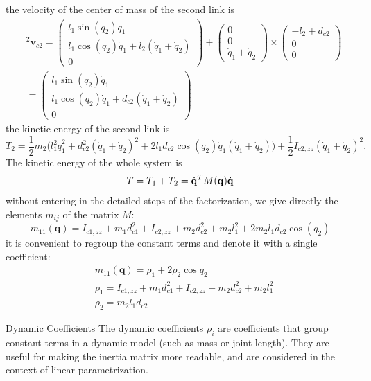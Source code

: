 \documentclass[10pt, a4paper]{report}
\newcommand{\q}{{\mathbf q}}
\begin{document}
the velocity of the center of mass of the second link is\begin{align}
    &{}^2\mathbf v_{c2}=\begin{pmatrix}
        l_1\sin (q_2)\dot q_1\\l_1\cos(q_2)\dot q_1 + l_2(\dot q_1+\dot q_2)
        \\0
    \end{pmatrix}+\begin{pmatrix}
        0\\0\\\dot q_1+\dot q_2
    \end{pmatrix}\times \begin{pmatrix}
        -l_2+d_{c2}\\ 0\\ 0
    \end{pmatrix}\\[1.5ex]
    &=\begin{pmatrix}
        l_1\sin(q_2)\dot q_1\\ 
        l_1\cos(q_2)\dot q_1+d_{c2}(\dot q_1+\dot q_2)
        \\ 0
    \end{pmatrix}
\end{align}
the kinetic energy of the second link is\begin{equation}
    T_2=\frac{1}{2}m_2\big ( l_1^2\dot q_1^2+d_{c2}^2(\dot q_1+\dot q_2)^2+
    2l_1d_{c2}\cos(q_2)\dot q_1(\dot q_1+\dot q_2)\big)+\frac{1}{2}I_{c2,zz}(\dot q_1+\dot q_2)^2.
\end{equation}
The kinetic energy of the whole system is\begin{equation}
    T=T_1+T_2=\dq^TM(\q)\dq 
\end{equation}
without entering in the detailed steps of the factorization, we give directly the elements $m_{ij}$ of the matrix $M$:\begin{equation}
    m_{11}(\q)=I_{c1,zz} + m_1 d_{c1}^2 + I_{c2,zz} + m_2 d_{c2}^2 + m_2 l_1^2 + 2m_2 l_1 d_{c2} \cos(q_2)
\end{equation}
it is convenient to regroup the constant terms and denote it with a single coefficient:
\begin{align}
   & m_{11}(\q)=\rho_1 + 2\rho_2 \cos q_2\\ 
   &\rho_1=I_{c1,zz} + m_1 d_{c1}^2 + I_{c2,zz} + m_2 d_{c2}^2 + m_2 l_1^2\\ 
   &\rho_2=m_2l_1d_{c2}
\end{align}
\begin{boxdefinition}{Dynamic Coefficients}{}
    The dynamic coefficients $\rho_i$ are coefficients that group constant terms in a dynamic model (such as mass or joint length). They are useful for making the inertia matrix more readable, and are considered in the context of linear parametrization.
\end{boxdefinition}
\end{document}
